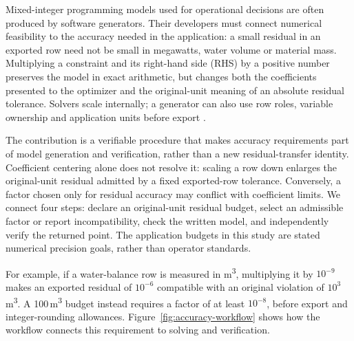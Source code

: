 Mixed-integer programming models used for operational decisions are often produced
by software generators. Their developers must connect numerical feasibility to the
accuracy needed in the application: a small residual in an exported row need not
be small in megawatts, water volume or material mass. Multiplying a constraint and
its right-hand side (RHS) by a positive number preserves the model in exact
arithmetic, but changes both the coefficients presented to the optimizer and the
original-unit meaning of an absolute residual tolerance. Solvers scale internally;
a generator can also use row roles, variable ownership and application units before
export \cite{gurobiExternalScaling,idaesScaling}.

The contribution is a verifiable procedure that makes accuracy requirements
part of model generation and verification, rather than a new residual-transfer
identity. Coefficient centering alone does not resolve it: scaling a row
down enlarges the original-unit residual admitted by a fixed exported-row tolerance.
Conversely, a factor chosen only for residual accuracy may conflict with coefficient
limits. We connect four steps: declare an original-unit residual budget, select an
admissible factor or report incompatibility, check the written model, and independently
verify the returned point. The application budgets in this study are stated numerical
precision goals, rather than operator standards.

For example, if a water-balance row is measured in m\textsuperscript{3},
multiplying it by $10^{-9}$ makes an exported residual of $10^{-6}$ compatible
with an original violation of $10^3$\,m\textsuperscript{3}. A
100\,m\textsuperscript{3} budget instead requires a factor of at least $10^{-8}$,
before export and integer-rounding allowances. Figure~\ref{fig:accuracy-workflow}
shows how the workflow connects this requirement to solving and verification.
